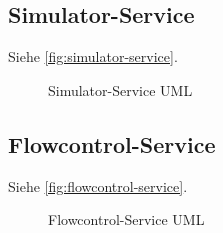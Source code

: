 \subsection{Simulator-Service}
Siehe \autoref{fig:simulator-service}.
\begin{figure}[h]
    \centering
    \caption{Simulator-Service UML}
    \label{fig:simulator-service}
\end{figure}

\subsection{Flowcontrol-Service}
Siehe \autoref{fig:flowcontrol-service}.
\begin{figure}[h]
    \centering
    \caption{Flowcontrol-Service UML}
    \label{fig:flowcontrol-service}
\end{figure}
